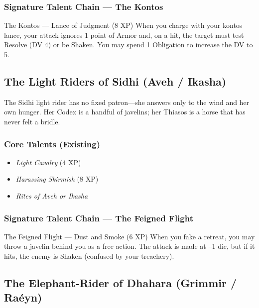 \documentclass[9pt,a5paper]{extbook}
\begin{document}
\subsubsection{Signature Talent Chain --- The Kontos}

\begin{talentbox}{The Kontos --- Lance of Judgment (8 XP)}
When you charge with your kontos lance, your attack ignores 1 point of Armor and, on a hit, the target must test Resolve (DV 4) or be Shaken. You may spend 1 Obligation to increase the DV to 5.
\end{talentbox}

\subsection{The Light Riders of Sidhi (Aveh / Ikasha)}

The Sidhi light rider has no fixed patron---she answers only to the wind and her own hunger. Her Codex is a handful of javelins; her Thiasos is a horse that has never felt a bridle.

\subsubsection{Core Talents (Existing)}
\begin{itemize}
    \item \textit{Light Cavalry} (4 XP)
    \item \textit{Harassing Skirmish} (8 XP)
    \item \textit{Rites of Aveh or Ikasha}
\end{itemize}

\subsubsection{Signature Talent Chain --- The Feigned Flight}

\begin{talentbox}{The Feigned Flight --- Dust and Smoke (6 XP)}
When you fake a retreat, you may throw a javelin behind you as a free action. The attack is made at --1 die, but if it hits, the enemy is Shaken (confused by your treachery).
\end{talentbox}

\subsection{The Elephant-Rider of Dhahara (Grimmir / Raéyn)}
\end{document}
